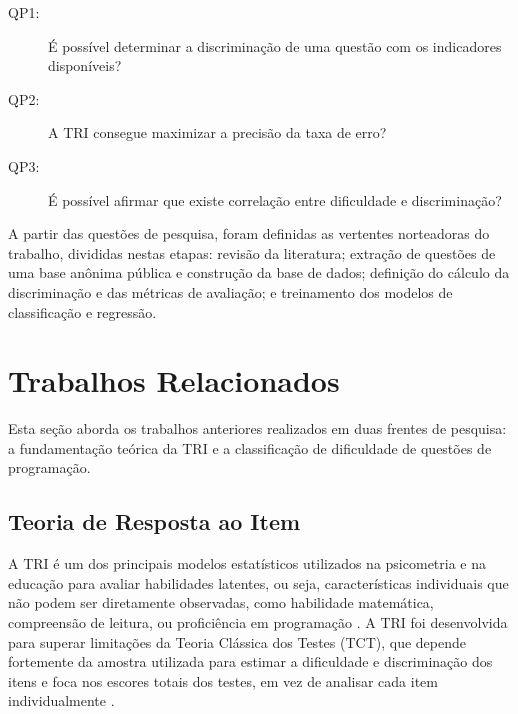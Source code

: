\documentclass[12pt]{article}
\begin{document}
\begin{description}
    \item [QP1:] É possível determinar a discriminação de uma questão com os indicadores disponíveis? 
    \item [QP2:] A TRI consegue maximizar a precisão da taxa de erro?
    \item [QP3:] É possível afirmar que existe correlação entre dificuldade e discriminação?
\end{description}

A partir das questões de pesquisa, foram definidas as vertentes norteadoras do trabalho, divididas nestas etapas: revisão da literatura; extração de questões de uma base anônima pública e construção da base de dados; definição do cálculo da discriminação e das métricas de avaliação; e treinamento dos modelos de classificação e regressão.


\section{Trabalhos Relacionados}


Esta seção aborda os trabalhos anteriores realizados em duas frentes de pesquisa: a fundamentação teórica da TRI e a classificação de dificuldade de questões de programação.

\subsection{Teoria de Resposta ao Item}

A TRI é um dos principais modelos estatísticos utilizados na psicometria e na educação para avaliar habilidades latentes, ou seja, características individuais que não podem ser diretamente observadas, como habilidade matemática, compreensão de leitura, ou proficiência em programação \cite{Liz2020}. A TRI foi desenvolvida para superar limitações da Teoria Clássica dos Testes (TCT), que depende fortemente da amostra utilizada para estimar a dificuldade e discriminação dos itens e foca nos escores totais dos testes, em vez de analisar cada item individualmente \cite{Valle2000}.
\end{document}
